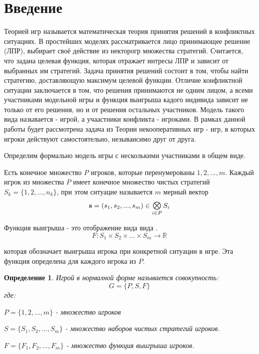 \section{Введение}

\qquad Теорией игр называется математическая теория принятия решений
в конфликтных ситуациях. В простейших моделях рассматривается лицо
принимающее решение (ЛПР), выбирает своё действие из некторогр множества стратегий. Считается, что задана целевая функция,
которая отражает интресы ЛПР и зависит от выбранных им стратегий.
Задача принятия решений состоит в том, чтобы найти стратегию, 
доставляющую максимум целевой функции. Отличие конфликтной ситуации
заключается в том, что решения принимаются не одним лицом, 
а всеми участниками модельной игры и функция выигрыша
кадого индивида зависит не только от его решения, но 
и от решения остальных участников.  Модель такого вида называется -
игрой, а учаастники конфликта - игроками. В рамках данной работы
будет рассмотрена задача из Теории некооперативных игр - 
игр, в которых игроки действуют самостоятельно, незываисимо друг 
от друга. 

Определим формально модель игры с несколькими участниками в общем виде.

Есть конечное множество $P$ игроков, которые перенумерованы
$1, 2, ..., m$. Каждый игрок из множества $P$ имеет конечное множество
чистых стратегий $S_k=\{1,2,...,n_k\}$, при этом ситуацие называется
$m$ мерный вектор
$$
\textbf{s} = (s_1, s_2, ..., s_m) \in \Motimes_{i \in P} S_i
$$

Функция выигрыша - это отображение вида вида .
\begin{equation}
	F: S_1 \times S_2 \times ... \times S_m \rightarrow \mathbb R
	\label{eq:payoff_function}
\end{equation}

которая обозначает выигрыша игрока при конкретной ситуации в игре.
Эта функция определена для каждого игрока из $P$.

\newtheorem{Def}{Определение}
\begin{Def}
	Игрой в нормалной форме называется совокупность:
	$$
		G = \lbrace P, S, F \rbrace
	$$
	где: 
 
	$P=\{1,2,...,m\}$ - множество игроков

	$S=\{S_1, S_2, ..., S_m\}$ - множество наборов чистых 
	стратегий игроков. 

	$F=\{F_1, F_2, ..., F_m\}$ - множество функция выигрыша игроков.
\end{Def}

